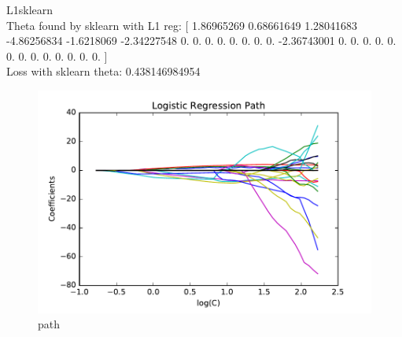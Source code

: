 \documentclass[pdftex,11pt]{article}
\begin{document}
L1sklearn\\
Theta found by sklearn with L1 reg:  [ 1.86965269  0.68661649  1.28041683 -4.86256834 -1.6218069  -2.34227548
  0.          0.          0.          0.          0.          0.          0.
  0.         -2.36743001  0.          0.          0.          0.          0.
  0.          0.          0.          0.          0.          0.          0.
  0.        ]\\
Loss with sklearn theta:  0.438146984954\\
\begin{figure}[H]
  \caption{path}
  \centering
    \includegraphics[scale=0.5]{fig5reg1.pdf}
\end{figure}
\end{document}
